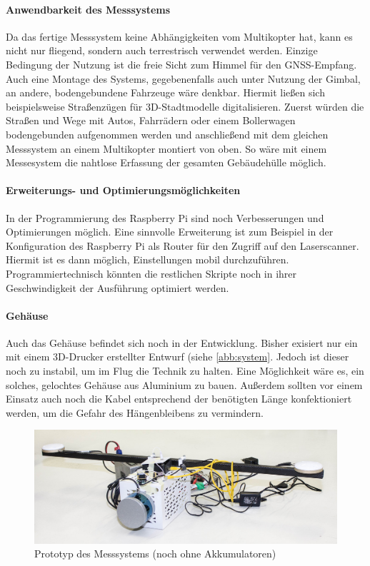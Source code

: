 \documentclass[a4paper,12pt,bibliography=totoc, listof=totoc,titlepage,pointlessnumbers]{scrreprt}
\begin{document}
\paragraph{Anwendbarkeit des Messsystems}
Da das fertige Messsystem keine Abhängigkeiten vom Multikopter hat, kann es nicht nur fliegend, sondern auch terrestrisch verwendet werden. Einzige Bedingung der Nutzung ist die freie Sicht zum Himmel für den GNSS-Empfang. Auch eine Montage des Systems, gegebenenfalls auch unter Nutzung der Gimbal, an andere, bodengebundene Fahrzeuge wäre denkbar. Hiermit ließen sich beispielsweise Straßenzügen für 3D-Stadtmodelle digitalisieren. Zuerst würden die Straßen und Wege mit Autos, Fahrrädern oder einem Bollerwagen bodengebunden aufgenommen werden und anschließend mit dem gleichen Messsystem an einem Multikopter montiert von oben. So wäre mit einem Messesystem die nahtlose Erfassung der gesamten Gebäudehülle möglich.

\paragraph{Erweiterungs- und Optimierungsmöglichkeiten}
In der Programmierung des Rasp\-berry Pi sind noch Verbesserungen und Optimierungen möglich. Eine sinnvolle Erweiterung ist zum Beispiel in der Konfiguration des Rasp\-berry Pi als Router für den Zugriff auf den Laser\-scan\-ner. Hiermit ist es dann möglich, Einstellungen mobil durchzuführen. Programmiertechnisch könnten die restlichen Skripte noch in ihrer Geschwindigkeit der Ausführung optimiert werden.

\paragraph{Gehäuse}
Auch das Gehäuse befindet sich noch in der Entwicklung. Bisher exisiert nur ein mit einem 3D-Drucker erstellter Entwurf (siehe \autoref{abb:system}. Jedoch ist dieser noch zu instabil, um im Flug die Technik zu halten. Eine Möglichkeit wäre es, ein solches, gelochtes Gehäuse aus Aluminium zu bauen. Außerdem sollten vor einem Einsatz auch noch die Kabel entsprechend der benötigten Länge konfektioniert werden, um die Gefahr des Hängenbleibens zu vermindern.

\begin{figure}[!ht]
 \centering
 \includegraphics[width=1\textwidth]{img/system.jpg}
 \caption{Prototyp des Messsystems (noch ohne Akkumulatoren)}
 \label{abb:system}
\end{figure}
\end{document}
